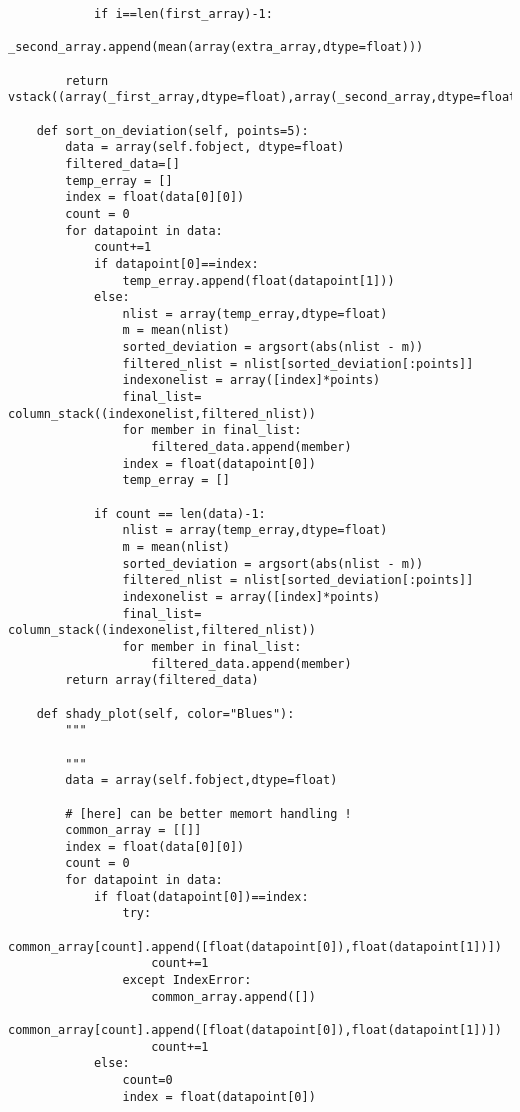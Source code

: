 \begin{verbatim}
            if i==len(first_array)-1:
                _second_array.append(mean(array(extra_array,dtype=float)))

        return vstack((array(_first_array,dtype=float),array(_second_array,dtype=float))).T
        
    def sort_on_deviation(self, points=5):
        data = array(self.fobject, dtype=float)
        filtered_data=[]
        temp_erray = []
        index = float(data[0][0])
        count = 0
        for datapoint in data:
            count+=1
            if datapoint[0]==index:
                temp_erray.append(float(datapoint[1]))
            else:
                nlist = array(temp_erray,dtype=float)
                m = mean(nlist)
                sorted_deviation = argsort(abs(nlist - m))
                filtered_nlist = nlist[sorted_deviation[:points]]
                indexonelist = array([index]*points)
                final_list= column_stack((indexonelist,filtered_nlist))
                for member in final_list:
                    filtered_data.append(member)
                index = float(datapoint[0])
                temp_erray = []

            if count == len(data)-1:
                nlist = array(temp_erray,dtype=float)
                m = mean(nlist)
                sorted_deviation = argsort(abs(nlist - m))
                filtered_nlist = nlist[sorted_deviation[:points]]
                indexonelist = array([index]*points)
                final_list= column_stack((indexonelist,filtered_nlist))
                for member in final_list:
                    filtered_data.append(member)
        return array(filtered_data)
    
    def shady_plot(self, color="Blues"):
        """
        
        """
        data = array(self.fobject,dtype=float)
        
        # [here] can be better memort handling !
        common_array = [[]]
        index = float(data[0][0])
        count = 0
        for datapoint in data:
            if float(datapoint[0])==index:
                try:
                    common_array[count].append([float(datapoint[0]),float(datapoint[1])])
                    count+=1
                except IndexError:
                    common_array.append([])
                    common_array[count].append([float(datapoint[0]),float(datapoint[1])])
                    count+=1
            else:
                count=0
                index = float(datapoint[0])


\end{verbatim}

